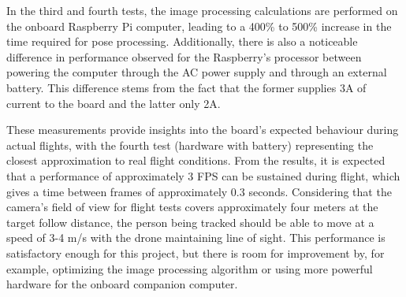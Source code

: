 In the third and fourth tests, the image processing calculations are performed on the onboard Raspberry Pi computer, leading to a 400\% to 500\% increase in the time required for pose processing. Additionally, there is also a noticeable difference in performance observed for the Raspberry's processor between powering the computer through the AC power supply and through an external battery. This difference stems from the fact that the former supplies 3A of current to the board and the latter only 2A.

These measurements provide insights into the board's expected behaviour during actual flights, with the fourth test (hardware with battery) representing the closest approximation to real flight conditions. From the results, it is expected that a performance of approximately 3 FPS can be sustained during flight, which gives a time between frames of approximately 0.3 seconds. Considering that the camera's field of view for flight tests covers approximately four meters at the target follow distance, the person being tracked should be able to move at a speed of 3-4 m/s with the drone maintaining line of sight. This performance is satisfactory enough for this project, but there is room for improvement by, for example, optimizing the image processing algorithm or using more powerful hardware for the onboard companion computer.
